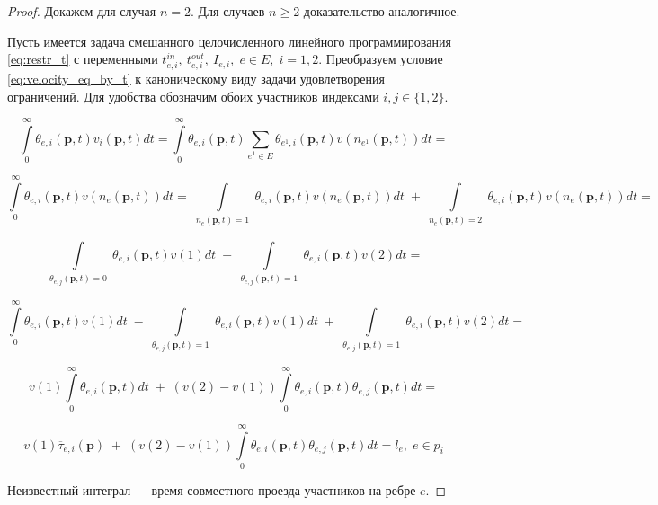 \documentclass[12pt, a4paper]{article}
\begin{document}
\begin{proof}
	Докажем для случая $n = 2$. Для случаев $n \ge 2$ доказательство аналогичное.
	
	Пусть имеется задача смешанного целочисленного линейного программирования \eqref{eq:restr_t} с переменными $t_{e, i}^{in}, \: t_{e, i}^{out}, \: I_{e, i}, \; e \in E, \; i = 1, 2$. Преобразуем условие \eqref{eq:velocity_eq_by_t} к каноническому виду задачи удовлетворения ограничений. Для удобства обозначим обоих участников индексами $i, j \in \{1, 2\}$.
	
	$$\int\limits_{0}^{\infty} \theta_{e, i} (\textbf{p}, t) v_i(\textbf{p}, t)dt = \int\limits_{0}^{\infty} \theta_{e, i} (\textbf{p}, t) \sum \limits _{e^1 \in E} \theta_{e^1, i} (\textbf{p}, t) v (n_{e^1} (\textbf{p}, t)) dt = $$
	
	$$\int\limits_{0}^{\infty} \theta_{e, i} (\textbf{p}, t)  v (n_{e} (\textbf{p}, t)) dt = 
	  \int\limits_{ \substack{n_{e} (\textbf{p}, t) = 1}} \theta_{e, i} (\textbf{p}, t)  v (n_{e} (\textbf{p}, t)) dt \; +
	  \int\limits_{ \substack{n_{e} (\textbf{p}, t) = 2}} \theta_{e, i} (\textbf{p}, t)  v (n_{e} (\textbf{p}, t)) dt = $$
	
	$$\int\limits_{ \substack{\theta_{e, j} (\textbf{p}, t) = 0}} \theta_{e, i} (\textbf{p}, t)  v (1) dt \; +
	  \int\limits_{ \substack{\theta_{e, j} (\textbf{p}, t) = 1}} \theta_{e, i} (\textbf{p}, t)  v (2) dt = $$
	  
    $$\int\limits_{0}^{\infty} \theta_{e, i} (\textbf{p}, t)  v (1) dt \; - 
      \int\limits_{ \substack{\theta_{e, j} (\textbf{p}, t) = 1}} \theta_{e, i} (\textbf{p}, t)  v (1) dt \; +
	  \int\limits_{ \substack{\theta_{e, j} (\textbf{p}, t) = 1}} \theta_{e, i} (\textbf{p}, t)  v (2) dt = $$
	  
	$$v (1) \int\limits_{0}^{\infty} \theta_{e, i} (\textbf{p}, t) dt \; + \;
	  (v (2) - v(1)) \int\limits_{0}^{\infty} \theta_{e, i} (\textbf{p}, t) \theta_{e, j} (\textbf{p}, t) dt = $$
	  
    $$v (1) \overline{\tau}_{e, i} (\textbf{p}) \; + \;
    (v (2) - v(1)) \int\limits_{0}^{\infty} \theta_{e, i} (\textbf{p}, t) \theta_{e, j} (\textbf{p}, t) dt = l_e, \; e \in p_i$$
	  
	Неизвестный интеграл --- время совместного проезда участников на ребре $e$.
	  

\end{proof}
\end{document}
